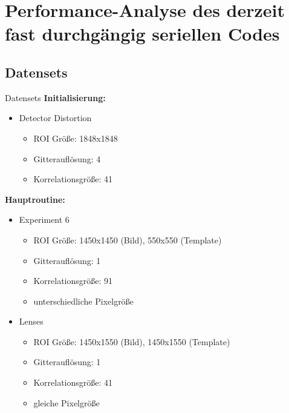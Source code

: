 \section{Performance-Analyse des derzeit fast durchgängig seriellen Codes}

\subsection{Datensets}
\begin{frame}{Datensets}
	\textbf{Initialisierung:}
	\begin{itemize}
		\item<2-> Detector Distortion
		\begin{itemize}
			\item ROI Größe: 1848x1848
			\item Gitterauflösung: 4
			\item Korrelationsgröße: 41
		\end{itemize}
	\end{itemize}
	\textbf{Hauptroutine:}
	\begin{itemize}
		\item<3-> Experiment 6
		\begin{itemize}
			\item ROI Größe: 1450x1450 (Bild), 550x550 (Template)
			\item Gitterauflösung: 1
			\item Korrelationsgröße: 91
			\item unterschiedliche Pixelgröße
		\end{itemize}
		\item<4-> Lenses
		\begin{itemize}
			\item ROI Größe: 1450x1550 (Bild), 1450x1550 (Template)
			\item Gitterauflösung: 1
			\item Korrelationsgröße: 41
			\item gleiche Pixelgröße
		\end{itemize}
	\end{itemize}
\end{frame}

